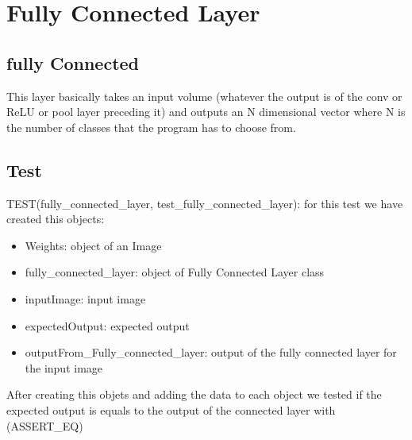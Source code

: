 \documentclass[parskip=full]{scrartcl}
\newcommand\tab[1][1cm]{\hspace*{#1}}
\begin{document}
\section {Fully Connected Layer}
	\subsection {fully Connected}
	\tab This layer basically takes an input volume (whatever the output is of the conv or ReLU or pool layer preceding it) and outputs an N dimensional vector where N is the number of classes that the program has to choose from.

	\subsection {Test}
	\tab TEST(fully\_connected\_layer, test\_fully\_connected\_layer): for this test we have created this objects:
	\begin {itemize}
		\item Weights: object of an Image
		\item fully\_connected\_layer: object of Fully Connected Layer class
		\item inputImage: input image
		\item expectedOutput: expected output
		\item outputFrom\_Fully\_connected\_layer: output of the fully connected layer for the input image
	\end {itemize}
\tab After creating this objets and adding the data to each object we tested if the expected output is equals to the output of the connected layer with (ASSERT\_EQ)
\end{document}
